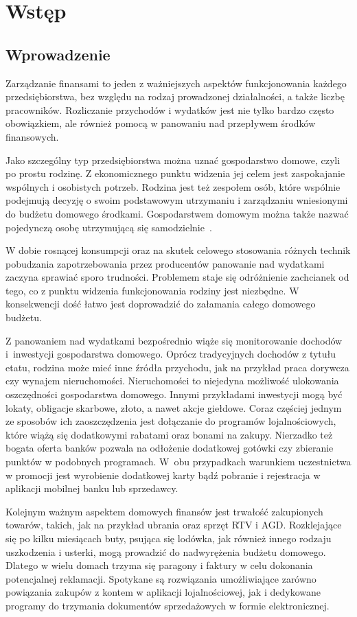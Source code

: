 \chapter{Wstęp}
\label{chap:wstep}
\section{Wprowadzenie}
\label{sec:wprowadzenie}
Zarządzanie finansami to jeden z ważniejszych aspektów funkcjonowania każdego przedsiębiorstwa, bez względu na rodzaj prowadzonej działalności, a także liczbę pracowników. Rozliczanie przychodów i wydatków jest nie tylko bardzo często obowiązkiem, ale również pomocą w panowaniu nad przepływem środków finansowych. 

Jako szczególny typ przedsiębiorstwa można uznać gospodarstwo domowe, czyli po prostu rodzinę. Z ekonomicznego punktu widzenia jej celem jest zaspokajanie wspólnych i osobistych potrzeb. Rodzina jest też zespołem osób, które wspólnie podejmują decyzję o swoim podstawowym utrzymaniu i zarządzaniu wniesionymi do budżetu domowego środkami. Gospodarstwem domowym można także nazwać pojedynczą osobę utrzymującą się samodzielnie~\cite{gospodarstwo-domowe}.

W dobie rosnącej konsumpcji oraz na skutek celowego stosowania różnych technik pobudzania zapotrzebowania przez producentów panowanie nad wydatkami zaczyna sprawiać sporo trudności. Problemem staje się odróżnienie zachcianek od tego, co z punktu widzenia funkcjonowania rodziny jest niezbędne. W konsekwencji dość łatwo jest doprowadzić do załamania całego domowego budżetu.

Z panowaniem nad wydatkami bezpośrednio wiąże się monitorowanie dochodów i~inwestycji gospodarstwa domowego. Oprócz tradycyjnych dochodów z tytułu etatu, rodzina może mieć inne źródła przychodu, jak na przykład praca dorywcza czy wynajem nieruchomości. Nieruchomości to niejedyna możliwość ulokowania oszczędności gospodarstwa domowego. Innymi przykładami inwestycji mogą być lokaty, obligacje skarbowe, złoto, a nawet akcje giełdowe. Coraz częściej jednym ze sposobów ich zaoszczędzenia jest dołączanie do programów lojalnościowych, które wiążą się dodatkowymi rabatami oraz bonami na zakupy. Nierzadko też bogata oferta banków pozwala na odłożenie dodatkowej gotówki czy zbieranie punktów w podobnych programach. W~obu przypadkach warunkiem uczestnictwa w promocji jest wyrobienie dodatkowej karty bądź pobranie i rejestracja w aplikacji mobilnej banku lub sprzedawcy.

Kolejnym ważnym aspektem domowych finansów jest trwałość zakupionych towarów, takich, jak na przykład ubrania oraz sprzęt RTV i AGD. Rozklejające się po kilku miesiącach buty, psująca się lodówka, jak również innego rodzaju uszkodzenia i usterki, mogą prowadzić do nadwyrężenia budżetu domowego. Dlatego w wielu domach trzyma się paragony i faktury w celu dokonania potencjalnej reklamacji. Spotykane są rozwiązania umożliwiające zarówno powiązania zakupów z kontem w aplikacji lojalnościowej, jak i dedykowane programy do trzymania dokumentów sprzedażowych w formie elektronicznej.

